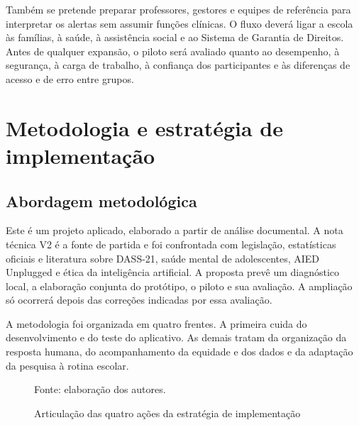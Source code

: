 \documentclass[
  12pt,
  openright,
  oneside,
  a4paper,
  english,
  brazil
]{abntex2}
\begin{document}
Também se pretende preparar professores, gestores e equipes de referência para
interpretar os alertas sem assumir funções clínicas. O fluxo deverá ligar a
escola às famílias, à saúde, à assistência social e ao Sistema de Garantia de
Direitos. Antes de qualquer expansão, o piloto será avaliado quanto ao
desempenho, à segurança, à carga de trabalho, à confiança dos participantes e
às diferenças de acesso e de erro entre grupos.

\chapter{Metodologia e estratégia de implementação}

\section{Abordagem metodológica}

Este é um projeto aplicado, elaborado a partir de análise documental. A nota
técnica V2 é a fonte de partida e foi confrontada com legislação,
estatísticas oficiais e literatura sobre DASS-21, saúde mental de adolescentes,
AIED Unplugged e ética da inteligência artificial. A proposta prevê um
diagnóstico local, a elaboração conjunta do protótipo, o piloto e sua avaliação.
A ampliação só ocorrerá depois das correções indicadas por essa avaliação.

A metodologia foi organizada em quatro frentes. A primeira cuida do
desenvolvimento e do teste do
aplicativo. As demais tratam da organização da resposta humana, do acompanhamento
da equidade e dos dados e da adaptação da pesquisa à rotina escolar.

\begin{figure}[htbp]
  \centering
  \caption{Articulação das quatro ações da estratégia de implementação}
  \label{fig:quatro-acoes}
  \par\smallskip
  \small Fonte: elaboração dos autores.
\end{figure}
\end{document}
